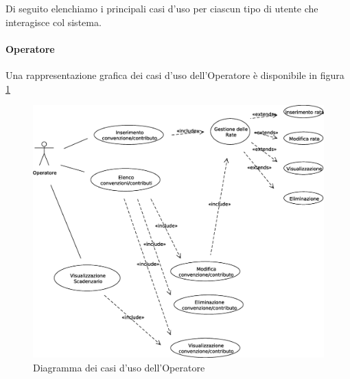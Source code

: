 Di seguito elenchiamo i principali casi d'uso per ciascun tipo di utente che interagisce col sistema. 

\paragraph{Operatore}
Una rappresentazione grafica dei casi d'uso dell'Operatore è disponibile in figura \ref{use_case_diag_operator}
\begin{figure}[h]
  \caption{Diagramma dei casi d'uso dell'Operatore}
  \label{use_case_diag_operator}
  \centering
    \includegraphics[width=1\textwidth]{images/casi_uso_operatore.eps}
\end{figure}

